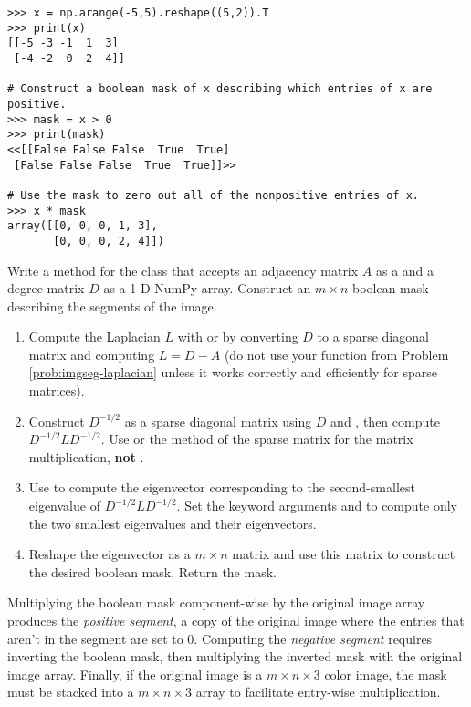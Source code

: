 \begin{lstlisting}
>>> x = np.arange(-5,5).reshape((5,2)).T
>>> print(x)
[[-5 -3 -1  1  3]
 [-4 -2  0  2  4]]

# Construct a boolean mask of x describing which entries of x are positive.
>>> mask = x > 0
>>> print(mask)
<<[[False False False  True  True]
 [False False False  True  True]]>>

# Use the mask to zero out all of the nonpositive entries of x.
>>> x * mask
array([[0, 0, 0, 1, 3],
       [0, 0, 0, 2, 4]])
\end{lstlisting}

\begin{problem}
Write a method for the  class that accepts an adjacency matrix $A$ as a  and a degree matrix $D$ as a 1-D NumPy array.
Construct an $m\times n$ boolean mask describing the segments of the image.
\begin{enumerate}
    \item Compute the Laplacian $L$ with  or by converting $D$ to a sparse diagonal matrix and computing $L = D - A$ (do not use your function from Problem \ref{prob:imgseg-laplacian} unless it works correctly and efficiently for sparse matrices).

    \item Construct $D^{-1/2}$ as a sparse diagonal matrix using $D$ and , then compute $D^{-1/2}LD^{-1/2}$.
    Use  or the  method of the sparse matrix for the matrix multiplication, \textbf{not} .

    \item Use  to compute the eigenvector corresponding to the second-smallest eigenvalue of $D^{-1/2} L D^{-1/2}$.
    Set the keyword arguments  and  to compute only the two smallest eigenvalues and their eigenvectors.

    \item Reshape the eigenvector as a $m\times n$ matrix and use this matrix to construct the desired boolean mask.
    Return the mask.
\end{enumerate}
\label{prob:imgseg-compute-mask}
\end{problem}

Multiplying the boolean mask component-wise by the original image array produces the \emph{positive segment}, a copy of the original image where the entries that aren't in the segment are set to $0$.
Computing the \emph{negative segment} requires inverting the boolean mask, then multiplying the inverted mask with the original image array.
Finally, if the original image is a $m \times n \times 3$ color image, the mask must be stacked into a $m \times n \times 3$ array to facilitate entry-wise multiplication.

